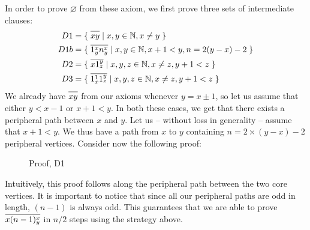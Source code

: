 In order to prove $\varnothing$ from these axiom, we first prove three sets of intermediate clauses:
\begin{align}
  D1 &= \{\; \ol{xy} \;|\; x,y \in \mathbb{N}, x \neq y \; \} \\
  D1b &= \{\; \ol{1^x_yn^x_y} \;|\; x,y \in \mathbb{N}, x+1 < y, n = 2(y-x)-2 \; \} \\
  D2 &= \{\; \ol{x1^y_z} \;|\; x,y,z \in \mathbb{N}, x \neq z, y+1 < z \; \} \\
  D3 &= \{\; \ol{1^1_x1^y_z} \;|\; x,y,z \in \mathbb{N}, x \neq z, y+1 < z \; \}
\end{align}
We already have $\ol{xy}$ from our axioms whenever $y = x \pm 1$, so let us assume that either $y < x-1$ or $x + 1 < y$.
In both these cases, we get that there exists a peripheral path between $x$ and $y$.
Let us -- without loss in generality -- assume that $x + 1 < y$.
We thus have a path from $x$ to $y$ containing $n = 2 \times (y - x) - 2$ peripheral vertices.
Consider now the following proof:\par
\begin{figure}[!h]
  \centering
  \begin{prooftree*}
  \end{prooftree*}
  \caption{Proof, D1}
  \label{fig:proof_d1}
\end{figure}
\FloatBarrier
Intuitively, this proof follows along the peripheral path between the two core vertices.
It is important to notice that since all our peripheral paths are odd in length, $(n-1)$ is always odd.
This guarantees that we are able to prove $\ol{x(n-1)^x_y}$ in $n/2$ steps using the strategy above.

